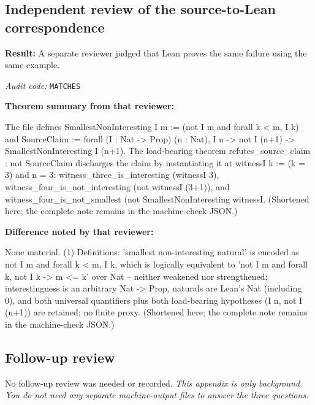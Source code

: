\documentclass[11pt]{article}
\begin{document}
\subsection*{Independent review of the source-to-Lean correspondence}
\textbf{Result:} A separate reviewer judged that Lean proves the same failure using the same example.
\par\textit{Audit code:} \nolinkurl{MATCHES}
\par\textbf{Theorem summary from that reviewer:}
\begin{Vsrc}
The file defines SmallestNonInteresting I m := (not I m and forall k < m, I k) and SourceClaim := forall (I : Nat -> Prop) (n : Nat), I n -> not I (n+1) -> SmallestNonInteresting I (n+1). The load-bearing theorem refutes_source_claim : not SourceClaim discharges the claim by instantiating it at witnessI k := (k = 3) and n = 3: witness_three_is_interesting (witnessI 3), witness_four_is_not_interesting (not witnessI (3+1)), and witness_four_is_not_smallest (not SmallestNonInteresting witnessI. (Shortened here; the complete note remains in the machine-check JSON.)
\end{Vsrc}
\par\textbf{Difference noted by that reviewer:}
\begin{Vsrc}
None material. (1) Definitions: 'smallest non-interesting natural' is encoded as not I m and forall k < m, I k, which is logically equivalent to 'not I m and forall k, not I k -> m <= k' over Nat -- neither weakened nor strengthened; interestingness is an arbitrary Nat -> Prop, naturals are Lean's Nat (including 0), and both universal quantifiers plus both load-bearing hypotheses (I n, not I (n+1)) are retained; no finite proxy. (Shortened here; the complete note remains in the machine-check JSON.)
\end{Vsrc}
\subsection*{Follow-up review}
No follow-up review was needed or recorded.
\textit{This appendix is only background. You do not need any separate machine-output files to answer the three questions.}
\end{document}
